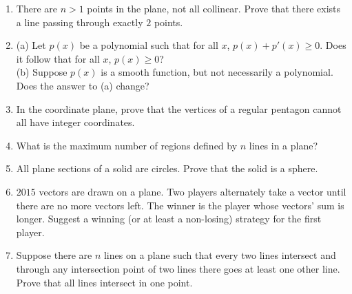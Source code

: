 \documentclass{article}
\begin{document}
\begin{enumerate}

	\item{There are $n>1$ points in the plane, not all collinear. Prove that there exists a line passing through exactly $2$ points.}

	\item{(a) Let $p(x)$ be a polynomial such that for all $x$, $p(x) + p'(x) \ge 0$. Does it follow that for all $x$, $p(x) \ge 0$?
\\(b) Suppose $p(x)$ is a smooth function, but not necessarily a polynomial. Does the answer to (a) change?}



	\item{In the coordinate plane, prove that the vertices of a regular pentagon cannot all have integer coordinates.}

	\item{What is the maximum number of regions defined by $n$ lines in a plane?}

    \item{All plane sections of a solid are circles. Prove that the solid is a sphere.}

    \item{$2015$ vectors are drawn on a plane. Two players alternately take a vector until there are no more vectors left. The winner is the player whose vectors’ sum is longer. Suggest a winning (or at least a non-losing) strategy for the first player}.

    \item{Suppose there are $n$ lines on a plane such that every two lines intersect and through any intersection point of two lines there goes at least one other line. Prove that all lines intersect in one point.}

\end{enumerate}
\end{document}
